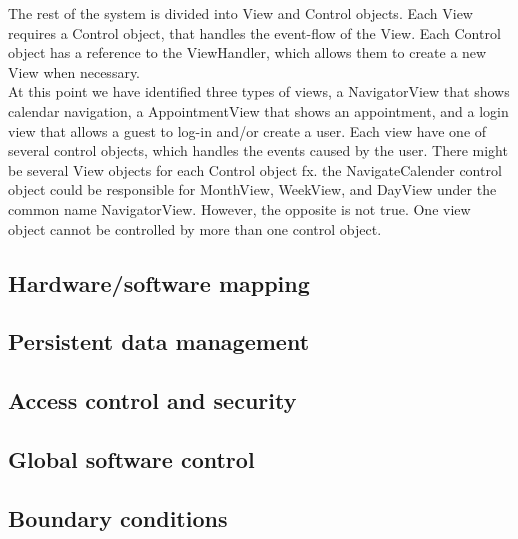 The rest of the system is divided into View and Control objects. Each View requires a Control object, that handles the event-flow of the View. Each Control object has a reference to the ViewHandler, which allows them to create a new View when necessary. \\

At this point we have identified three types of views, a NavigatorView that shows calendar navigation, a AppointmentView that shows an appointment, and a login view that allows a guest to log-in and/or create a user. Each view have one of several control objects, which handles the events caused by the user. There might be several View objects for each Control object fx. the NavigateCalender control object could be responsible for MonthView, WeekView, and DayView under the common name NavigatorView. However, the opposite is not true. One view object cannot be controlled by more than one control object. 

\subsection{Hardware/software mapping}


\subsection{Persistent data management}


\subsection{Access control and security}


\subsection{Global software control}


\subsection{Boundary conditions}


